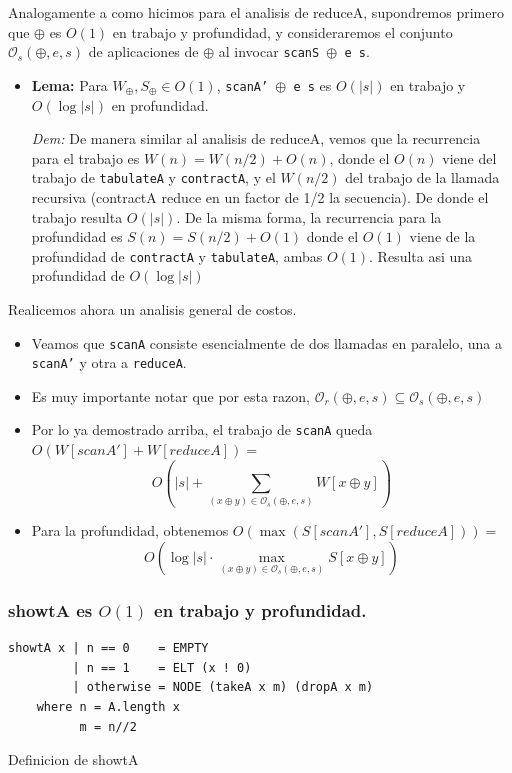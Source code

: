 \documentclass[12pt]{article}
\begin{document}
Analogamente a como hicimos para el analisis de reduceA, supondremos primero que $\oplus$ es $O(1)$ en trabajo y profundidad, y consideraremos el conjunto $\mathcal{O}_s(\oplus,e,s)$ de aplicaciones de $\oplus$ al invocar \texttt{scanS $\oplus$ e s}.

\begin{itemize}
\item \textbf{Lema:} Para $W_\oplus,S_\oplus \in O(1)$, \texttt{scanA' $\oplus$ e s} es $O(|s|)$ en trabajo y $O(\log |s|)$ en profundidad.

 \textit{Dem:} De manera similar al analisis de reduceA, vemos que la recurrencia para el trabajo es $W(n) = W(n/2) + O(n)$, donde el $O(n)$  viene del trabajo de \texttt{tabulateA} y \texttt{contractA}, y el $W(n/2)$ del trabajo de la llamada recursiva (contractA reduce en un factor de 1/2 la secuencia). De donde el trabajo resulta $O(|s|)$. De la misma forma, la recurrencia para la profundidad es $S(n) = S(n/2) + O(1)$ donde el $O(1)$ viene de la profundidad de \texttt{contractA} y \texttt{tabulateA}, ambas $O(1)$. Resulta asi una profundidad de $O(\log |s|)$
\end{itemize}

Realicemos ahora un analisis general de costos.

\begin{itemize}
\item Veamos que \texttt{scanA} consiste esencialmente de dos llamadas en paralelo, una a \texttt{scanA'} y otra a \texttt{reduceA}.

\item Es muy importante notar que por esta razon, $\mathcal{O}_r(\oplus,e,s) \subseteq \mathcal{O}_s(\oplus,e,s)$

\item Por lo ya demostrado arriba, el trabajo de \texttt{scanA} queda $O(W[scanA'] + W[reduceA]) =$ $$O(|s| + \sum\limits_{(x\oplus y)\in\mathcal{O}_s(\oplus,e,s)} W[x\oplus y])$$

\item Para la profundidad, obtenemos $O(\max (S[scanA'], S[reduceA])) = $ $$O(\log |s|\cdot \max\limits_{(x\oplus y)\in\mathcal{O}_s(\oplus,e,s)} S[x\oplus y])$$
\end{itemize}
\subsubsection{showtA es $O(1)$ en trabajo y profundidad.}

\begin{table}[h]
\begin{lstlisting}
showtA x | n == 0    = EMPTY 
         | n == 1    = ELT (x ! 0)
         | otherwise = NODE (takeA x m) (dropA x m)
    where n = A.length x
          m = n//2
\end{lstlisting}
\caption{Definicion de showtA}
\end{table}
\end{document}
